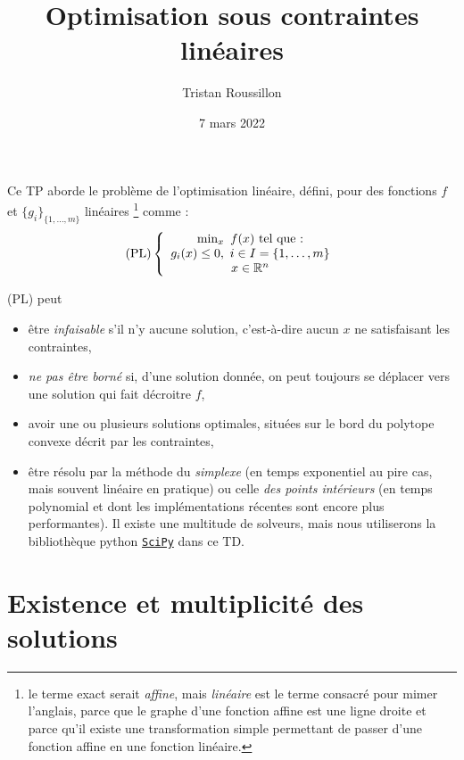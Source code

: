 \documentclass[a4paper,francais]{article}
\title{Optimisation sous contraintes linéaires}
\author{Tristan Roussillon}
\date{7 mars 2022}
\newcommand{\R}{{\ensuremath\mathbb{R}}}
\theoremstyle{definition}
\begin{document}
\maketitle

Ce TP aborde le problème de l'optimisation linéaire, défini,
pour des fonctions $f$ et $\{g_i\}_{\{1, \dots, m\}}$ linéaires
\footnote{le terme exact serait \emph{affine}, mais \emph{linéaire}
  est le terme consacré pour mimer l'anglais, parce que le graphe
  d'une fonction affine est une ligne droite et parce qu'il
  existe une transformation simple permettant de passer d'une
  fonction affine en une fonction linéaire.}
comme :
\[
\text{(PL)} \left\{
\begin{array}{c}
  \min_{x} \ f(x) \ \text{tel que :} \\
  g_i(x) \leq 0, \ i \in I = \{1, \dots, m\} \\
  x \in  \R^n \\
\end{array}
\right.
\]

(PL) peut
\begin{itemize}
\item être \emph{infaisable} s'il n'y aucune solution,
  c'est-à-dire aucun $x$ ne satisfaisant les contraintes,
\item \emph{ne pas être borné} si, d'une solution donnée, on peut
  toujours se déplacer vers une solution qui fait décroitre $f$,
\item avoir une ou plusieurs solutions optimales, situées
  sur le bord du polytope convexe décrit par les contraintes,
\item être résolu par la méthode du \emph{simplexe}
  (en temps exponentiel au pire cas, mais souvent linéaire en
  pratique) ou celle \emph{des points intérieurs} (en temps
  polynomial et dont les implémentations récentes sont encore
  plus performantes). Il existe une multitude de solveurs,
  mais nous utiliserons la bibliothèque python
  \href{https://docs.scipy.org/doc/}{\texttt{SciPy}} dans
  ce TD.
\end{itemize} 

\section{Existence et multiplicité des solutions}
\label{sec:sol}
\end{document}
